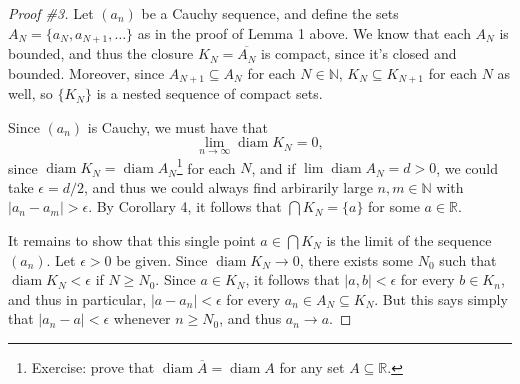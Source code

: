 \documentclass[12pt,letterpaper]{article}
\newcommand{\abs}[1]{\lvert #1\rvert}
\newcommand{\R}{\mathbb{R}}
\newcommand{\N}{\mathbb{N}}
\DeclareMathOperator{\diam}{diam}
\begin{document}
\begin{proof}[Proof \#3]
Let $(a_n)$ be a Cauchy sequence, and define the sets $A_N=\{a_N,a_{N+1},\ldots\}$ as in the proof of Lemma 1 above. We know that each $A_N$ is bounded, and thus the closure $K_N=\overline{A_N}$ is compact, since it's closed and bounded. Moreover, since $A_{N+1}\subseteq A_N$ for each $N\in\N$, $K_{N}\subseteq K_{N+1}$ for each $N$ as well, so $\{K_N\}$ is a nested sequence of compact sets.

Since $(a_n)$ is Cauchy, we must have that
\[
 \lim_{n\to\infty}\diam K_N = 0,
\]
since $\diam K_N = \diam A_N$\footnote{Exercise: prove that $\diam \overline{A} = \diam A$ for any set $A\subseteq \R$.} for each $N$, and if $\lim\diam A_N = d >0$, we could take $\epsilon=d/2$, and thus we could always find arbirarily large $n,m\in\N$ with $\abs{a_n-a_m}>\epsilon$. By Corollary 4, it follows that $\bigcap K_N = \{a\}$ for some $a\in \R$.

It remains to show that this single point $a\in\bigcap K_N$ is the limit of the sequence $(a_n)$. Let $\epsilon>0$ be given. Since $\diam K_N\to 0$, there exists some $N_0$ such that $\diam K_N<\epsilon$ if  $N\geq N_0$. Since $a\in K_N$, it follows that $\abs{a,b}<\epsilon$ for every $b\in K_n$, and thus in particular, $\abs{a-a_n}<\epsilon$ for every $a_n\in A_N\subseteq K_N$. But this says simply that $\abs{a_n-a}<\epsilon$ whenever $n\geq N_0$, and thus $a_n\to a$.
\end{proof}
\end{document}
